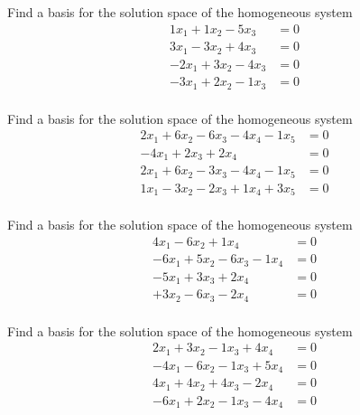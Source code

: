 \documentclass{article}
\begin{document}
\begin{exerciseStatement}
    Find a basis for the solution space of the homogeneous system
\begin{align*}
 1 x_ 1 + 1 x_ 2 -5 x_ 3 &= 0  \\
  3 x_ 1 -3 x_ 2 + 4 x_ 3 &= 0  \\
  -2 x_ 1 + 3 x_ 2 -4 x_ 3 &= 0  \\
  -3 x_ 1 + 2 x_ 2 -1 x_ 3 &= 0  \\
 \end{align*}



  
\end{exerciseStatement}

\begin{exerciseStatement}
    Find a basis for the solution space of the homogeneous system
\begin{align*}
 2 x_ 1 + 6 x_ 2 -6 x_ 3 -4 x_ 4 -1 x_ 5 &= 0  \\
  -4 x_ 1 + 2 x_ 3 + 2 x_ 4 &= 0  \\
  2 x_ 1 + 6 x_ 2 -3 x_ 3 -4 x_ 4 -1 x_ 5 &= 0  \\
  1 x_ 1 -3 x_ 2 -2 x_ 3 + 1 x_ 4 + 3 x_ 5 &= 0  \\
 \end{align*}



  
\end{exerciseStatement}

\begin{exerciseStatement}
    Find a basis for the solution space of the homogeneous system
\begin{align*}
 4 x_ 1 -6 x_ 2 + 1 x_ 4 &= 0  \\
  -6 x_ 1 + 5 x_ 2 -6 x_ 3 -1 x_ 4 &= 0  \\
  -5 x_ 1 + 3 x_ 3 + 2 x_ 4 &= 0  \\
  + 3 x_ 2 -6 x_ 3 -2 x_ 4 &= 0  \\
 \end{align*}



  
\end{exerciseStatement}

\begin{exerciseStatement}
    Find a basis for the solution space of the homogeneous system
\begin{align*}
 2 x_ 1 + 3 x_ 2 -1 x_ 3 + 4 x_ 4 &= 0  \\
  -4 x_ 1 -6 x_ 2 -1 x_ 3 + 5 x_ 4 &= 0  \\
  4 x_ 1 + 4 x_ 2 + 4 x_ 3 -2 x_ 4 &= 0  \\
  -6 x_ 1 + 2 x_ 2 -1 x_ 3 -4 x_ 4 &= 0  \\
 \end{align*}



  
\end{exerciseStatement}
\end{document}
